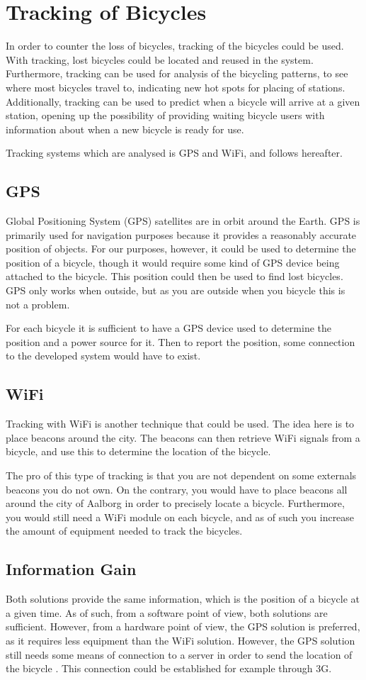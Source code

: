 \section{Tracking of Bicycles}
In order to counter the loss of bicycles, tracking of the bicycles could be used.
With tracking, lost bicycles could be located and reused in the system.
Furthermore, tracking can be used for analysis of the bicycling patterns, to see where most bicycles travel to, indicating new hot spots for placing of stations.
Additionally, tracking can be used to predict when a bicycle will arrive at a given station, opening up the possibility of providing waiting bicycle users with information about when a new bicycle is ready for use.

Tracking systems which are analysed is GPS and WiFi, and follows hereafter.
\subsection{GPS}
Global Positioning System (GPS) satellites are in orbit around the Earth.
GPS is primarily used for navigation purposes because it provides a reasonably accurate position of objects.
For our purposes, however, it could be used to determine the position of a bicycle, though it would require some kind of GPS device being attached to the bicycle.
This position could then be used to find lost bicycles.
GPS only works when outside, but as you are outside when you bicycle this is not a problem.

For each bicycle it is sufficient to have a GPS device used to determine the position and a power source for it.
Then to report the position, some connection to the developed system would have to exist.

\subsection{WiFi}
Tracking with WiFi is another technique that could be used.
The idea here is to place beacons around the city.
The beacons can then retrieve WiFi signals from a bicycle, and use this to determine the location of the bicycle.

The pro of this type of tracking is that you are not dependent on some externals beacons you do not own.
On the contrary, you would have to place beacons all around the city of Aalborg in order to precisely locate a bicycle.
Furthermore, you would still need a WiFi module on each bicycle, and as of such you increase the amount of equipment needed to track the bicycles.

\subsection{Information Gain}
Both solutions provide the same information, which is the position of a bicycle at a given time.
As of such, from a software point of view, both solutions are sufficient.
However, from a hardware point of view, the GPS solution is preferred, as it requires less equipment than the WiFi solution. 
However, the GPS solution still needs some means of connection to a server in order to send the location of the bicycle \citep{misc:gpsSystem}. 
This connection could be established for example through 3G.
